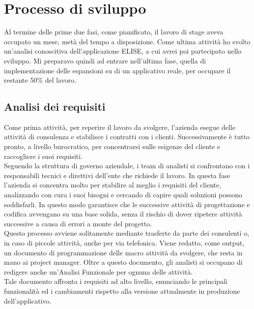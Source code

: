 \section{Processo di sviluppo}

Al termine delle prime due fasi, come pianificato, il lavoro di stage aveva occupato un mese, metà del tempo a disposizione. Come ultima attività ho svolto un'analisi conoscitiva dell'applicazione ELISE, a cui avrei poi partecipato nello sviluppo. Mi preparavo quindi ad entrare nell'ultima fase, quella di implementazione delle espansioni su di un applicativo reale, per occupare il restante 50\% del lavoro.\\

	\subsection{Analisi dei requisiti}
	
	Come prima attività, per reperire il lavoro da svolgere, l'azienda esegue delle attività di consulenza e stabilisce i contratti con i clienti. Successivamente è tutto pronto, a livello burocratico, per concentrarsi sulle esigenze del cliente e raccogliere i suoi requisiti.\\
	
	Seguendo la struttura di governo aziendale, i team di analisti si confrontano con i responsabili tecnici e direttivi dell'ente che richiede il lavoro. In questa fase l'azienda si concentra molto per stabilire al meglio i requisiti del cliente, analizzando con cura i suoi bisogni e cercando di capire quali soluzioni possono soddisfarli. In questo modo garantisce che le successive attività di progettazione e codifica avvengano su una base solida, senza il rischio di dover ripetere attività successive a causa di errori a monte del progetto.\\
	
	 Questo processo avviene solitamente mediante trasferte da parte dei consulenti o, in caso di piccole attività, anche per via telefonica. Viene redatto, come output, un documento di programmazione delle macro attività da svolgere, che resta in mano ai project manager. Oltre a questo documento, gli analisti si occupano di redigere anche un'Analisi Funzionale per ognuna delle attività.\\
	 
	 Tale documento affronta i requisiti ad alto livello, enunciando le principali funzionalità ed i cambiamenti rispetto alla versione attualmente in produzione dell'applicativo. \\
	
